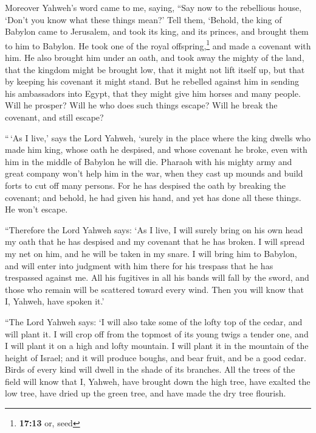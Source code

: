  Moreover Yahweh's word came to me, saying,
 ``Say now to the rebellious house, `Don't you know what
these things mean?' Tell them, `Behold, the king of Babylon came to
Jerusalem, and took its king, and its princes, and brought them to him
to Babylon.  He took one of the royal
offspring,\footnote{\textbf{17:13} or, seed} and made a covenant with
him. He also brought him under an oath, and took away the mighty of the
land,  that the kingdom might be brought low, that it
might not lift itself up, but that by keeping his covenant it might
stand.  But he rebelled against him in sending his
ambassadors into Egypt, that they might give him horses and many people.
Will he prosper? Will he who does such things escape? Will he break the
covenant, and still escape?

 ``\,`As I live,' says the Lord Yahweh, `surely in the
place where the king dwells who made him king, whose oath he despised,
and whose covenant he broke, even with him in the middle of Babylon he
will die.  Pharaoh with his mighty army and great company
won't help him in the war, when they cast up mounds and build forts to
cut off many persons.  For he has despised the oath by
breaking the covenant; and behold, he had given his hand, and yet has
done all these things. He won't escape.

 ``Therefore the Lord Yahweh says: `As I live, I will
surely bring on his own head my oath that he has despised and my
covenant that he has broken.  I will spread my net on
him, and he will be taken in my snare. I will bring him to Babylon, and
will enter into judgment with him there for his trespass that he has
trespassed against me.  All his fugitives in all his
bands will fall by the sword, and those who remain will be scattered
toward every wind. Then you will know that I, Yahweh, have spoken it.'

 ``The Lord Yahweh says: `I will also take some of the
lofty top of the cedar, and will plant it. I will crop off from the
topmost of its young twigs a tender one, and I will plant it on a high
and lofty mountain.  I will plant it in the mountain of
the height of Israel; and it will produce boughs, and bear fruit, and be
a good cedar. Birds of every kind will dwell in the shade of its
branches.  All the trees of the field will know that I,
Yahweh, have brought down the high tree, have exalted the low tree, have
dried up the green tree, and have made the dry tree flourish.

